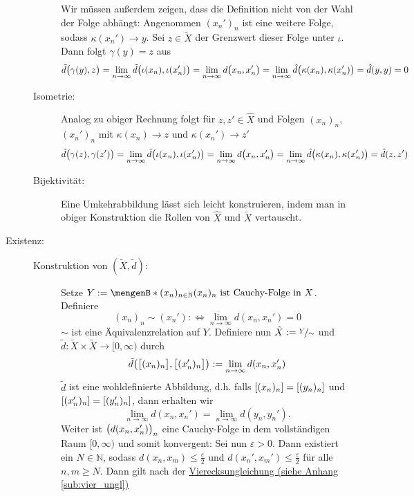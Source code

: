 \begin{description}
\begin{description}
		Wir müssen außerdem zeigen, dass die Definition nicht von der Wahl der Folge abhängt: Angenommen $(x_n')_n$ ist eine weitere Folge, sodass $\kappa(x_n') \to y$.
		Sei $z \in \tilde{X}$ der Grenzwert dieser Folge unter $\iota$. Dann folgt $\gamma(y)=z$ aus
		\begin{align*}
			\tilde{d}\enbrace[\big]{\gamma(y),z} = \lim_{n \to \infty} \tilde{d}\enbrace[\big]{\iota(x_n), \iota(x_n')} = \lim_{n \to \infty} d \enbrace[\big]{x_n,x_n'}
			= \lim_{n \to \infty} \hat{d}\enbrace[\big]{\kappa(x_n), \kappa(x_n')} = \hat{d}(y,y) =0
		\end{align*}
		\item[Isometrie:] Analog zu obiger Rechnung folgt für $z,z' \in \hat{X}$ und Folgen $(x_n)_n$, $(x_n')_n$ mit $\kappa(x_n) \to z$ und $\kappa(x_n')\to z'$
		\begin{align*}
			\tilde{d}\enbrace[\big]{\gamma(z),\gamma(z')} = \lim_{n \to \infty} \tilde{d}\enbrace[\big]{\iota(x_n), \iota(x_n')} = \lim_{n \to \infty} d \enbrace[\big]{x_n,x_n'}
			= \lim_{n \to \infty} \hat{d}\enbrace[\big]{\kappa(x_n), \kappa(x_n')} = \hat{d}(z,z')
		\end{align*}
		\item[Bijektivität:] Eine Umkehrabbildung lässt sich leicht konstruieren, indem man in obiger Konstruktion die Rollen von $\hat{X}$ und $\tilde{X}$ vertauscht.
	\end{description}
	\item[Existenz:] \begin{description}
		\item[Konstruktion von $(\tilde{X}, \tilde{d})$:] Setze $Y := \set[(x_n)_{n \in \mathds{N}}]{(x_n)_n \text{ ist Cauchy-Folge in }X}$. Definiere 
	\[
		(x_n)_n \sim (x_n') :\iff \lim_{ n \to \infty} d(x_n, x_n') = 0
	\]
	$\sim$ ist eine Äquivalenzrelation auf $Y$. Definiere nun $\tilde{X} := \nicefrac{Y}{\sim}$ und $\tilde{d} \colon \tilde{X} \times \tilde{X} \to [0, \infty)$ durch
	\[
		\tilde{d} \enbrace*{\benbrace[\big]{(x_n)_n} , \benbrace[\big]{(x_n')_n}  } := \lim_{ n \to \infty} d(x_n , x_n') 
	\]
	$\tilde{d}$ ist eine wohldefinierte Abbildung, d.h. falls $\benbrace*{(x_n)_n} = \benbrace*{(y_n)_n} $ und $\benbrace*{(x_n')_n} = \benbrace*{(y_n')_n}$, dann erhalten wir
	\[
		\lim_{n \to \infty} d(x_n , x_n') = \lim_{n \to \infty} d(y_n, y_n'). \tag*{(leichte Übung)}
	\]
	Weiter ist $\enbrace[\big]{d(x_n, x_n')}_n$ eine Cauchy-Folge in dem vollständigen Raum $[0,\infty)$ und somit 
	konvergent: Sei nun $\varepsilon>0$. Dann existiert ein $N \in \mathds{N}$, sodass $d(x_n,x_m) \le \frac{\varepsilon}{2}$ und $d(x_n', x_m') \le \frac{\varepsilon}{2}$ für alle $n,m \ge N$. Dann gilt nach der \hyperref[sub:vier_ungl]{Vierecksungleichung (siehe Anhang \ref*{sub:vier_ungl})}

\end{description}
\end{description}
